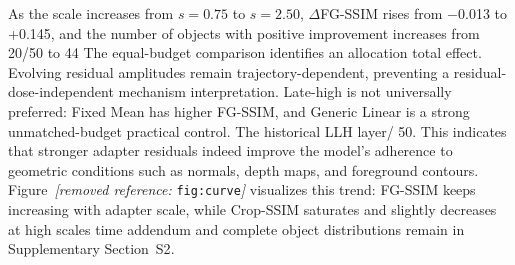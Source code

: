 \documentclass[times,twocolumn,final]{elsarticle}
\providecommand{\DIFadd}[1]{{\protect\color{blue} \sf #1}} %
\providecommand{\DIFdel}[1]{{\protect\color{red} \scriptsize #1}} %
\providecommand{\DIFaddbegin}{} %
\providecommand{\DIFaddend}{} %
\providecommand{\DIFdelbegin}{} %
\providecommand{\DIFdelend}{} %
\begin{document}
\DIFdelbegin %

\DIFdel{As the scale increases from $s = 0.75$ to $s = 2.50$, $\Delta$FG-SSIM rises from $-$0.013 to +0.145, and the number of objects with positive improvement increases from 20/50 to 44}\DIFdelend \DIFaddbegin \DIFadd{The equal-budget comparison identifies an allocation total effect. Evolving residual amplitudes remain trajectory-dependent, preventing a residual-dose-independent mechanism interpretation. Late-high is not universally preferred: Fixed Mean has higher FG-SSIM, and Generic Linear is a strong unmatched-budget practical control. The historical LLH layer}\DIFaddend /\DIFdelbegin \DIFdel{50. This indicates that stronger adapter residuals indeed improve the model's adherence to geometric conditions such as normals, depth maps, and foreground contours. Figure~\textit{[removed reference: }\texttt{fig:curve}\textit{]} visualizes this trend: FG-SSIM keeps increasing with adapter scale, while Crop-SSIM saturates and slightly decreases at high scales}\DIFdelend \DIFaddbegin \DIFadd{time addendum and complete object distributions remain in Supplementary Section~S2}\DIFaddend .
\end{document}
